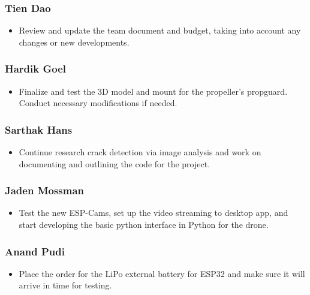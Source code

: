 \documentclass[12pt]{article}
\begin{document}
            \subsubsection*{Tien Dao}
                \begin{itemize}
                    \item Review and update the team document and budget, taking into account any changes or new developments.
                \end{itemize}
            \subsubsection*{Hardik Goel}
                \begin{itemize}
                    \item Finalize and test the 3D model and mount for the propeller's propguard. Conduct necessary modifications if needed.
                \end{itemize}
            \subsubsection*{Sarthak Hans}
                \begin{itemize}
                    \item Continue research crack detection via image analysis and work on documenting and outlining the code for the project.
                \end{itemize}
            \subsubsection*{Jaden Mossman}
                \begin{itemize}
                    \item Test the new ESP-Cams, set up the video streaming to desktop app, and start developing the basic python interface in Python for the drone.
                \end{itemize}
            \subsubsection*{Anand Pudi}
                \begin{itemize}
                    \item Place the order for the LiPo external battery for ESP32 and make sure it will arrive in time for testing.
                \end{itemize}
\end{document}
